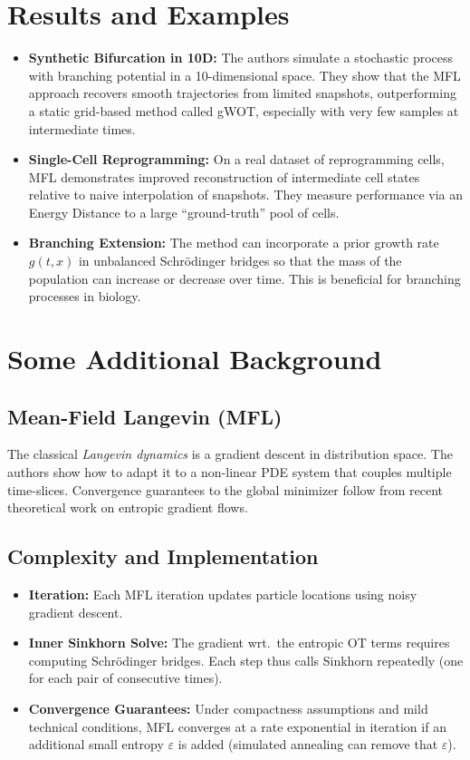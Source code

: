 \documentclass{article}
\begin{document}
\section{Results and Examples}
\begin{itemize}
    \item \textbf{Synthetic Bifurcation in 10D:} The authors simulate a stochastic process with branching potential in a 10-dimensional space. They show that the MFL approach recovers smooth trajectories from limited snapshots, outperforming a static grid-based method called gWOT, especially with very few samples at intermediate times.
    \item \textbf{Single-Cell Reprogramming:} On a real dataset of reprogramming cells, MFL demonstrates improved reconstruction of intermediate cell states relative to naive interpolation of snapshots. They measure performance via an Energy Distance to a large ``ground-truth'' pool of cells.
    \item \textbf{Branching Extension:} The method can incorporate a prior growth rate $g(t,x)$ in unbalanced Schr\"odinger bridges so that the mass of the population can increase or decrease over time. This is beneficial for branching processes in biology.
\end{itemize}

\section{Some Additional Background}
\subsection{Mean-Field Langevin (MFL)}
The classical \emph{Langevin dynamics} is a gradient descent in distribution space. The authors show how to adapt it to a non-linear PDE system that couples multiple time-slices. Convergence guarantees to the global minimizer follow from recent theoretical work on entropic gradient flows.

\subsection{Complexity and Implementation}
\begin{itemize}
    \item \textbf{Iteration:} Each MFL iteration updates particle locations using noisy gradient descent. 
    \item \textbf{Inner Sinkhorn Solve:} The gradient wrt.\ the entropic OT terms requires computing Schr\"odinger bridges. Each step thus calls Sinkhorn repeatedly (one for each pair of consecutive times).
    \item \textbf{Convergence Guarantees:} Under compactness assumptions and mild technical conditions, MFL converges at a rate exponential in iteration if an additional small entropy $\varepsilon$ is added (simulated annealing can remove that $\varepsilon$).
\end{itemize}
\end{document}
